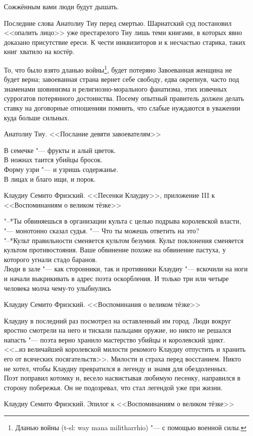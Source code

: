 \epigraph
{Сожжённым вами люди будут дышать.}
{Последние слова Анатолиу Тиу перед смертью.
Шариатский суд постановил <<опалить лицо>> уже престарелого Тиу лишь теми книгами, в которых явно доказано присутствие ереси.
К чести инквизиторов и к несчастью старика, таких книг хватило на костёр.}

\epigraph
{То, что было взято дланью войны\footnote
{Дланью войны (t-sl: way mana militharrhio) "--- с помощью военной силы. \authornote},
будет потеряно\ldotst
Завоеванная женщина не будет верна;
завоеванная страна вернет себе свободу, едва окрепнув, часто под знаменами шовинизма и религиозно-морального фанатизма, этих извечных суррогатов потерянного достоинства.
Посему опытный правитель должен делать ставку на договорные отношения\ldotst и помнить, что слабые нуждаются в уважении куда больше сильных.}
{Анатолиу Тиу.
<<Послание девяти завоевателям>>}

\epigraph
{В семечке "--- фрукты и алый цветок.\\
В ножнах таится убийцы бросок.\\
Форму узри "--- и узришь содержанье.\\
В лицах и благо ищи, и порок.}
{Клаудиу Семито Фризский.
<<Песенки Клаудиу>>, приложение III к <<Воспоминаниям о великом тёзке>>}

\epigraph
{"--*Ты обвиняешься в организации культа с целью подрыва королевской власти, "--- монотонно сказал судья.
"--- Что ты можешь ответить на это?\\
"--*Культ правильности сменяется культом безумия.
Культ поклонения сменяется культом противостояния.
Ваше обвинение похоже на обвинение пастуха, у которого угнали стадо баранов.\\
Люди в зале "--- как сторонники, так и противники Клаудиу "--- вскочили на ноги и начали выкрикивать в адрес поэта оскорбления.
И только три или четыре человека молча чему-то улыбнулись\ldotst}
{Клаудиу Семито Фризский.
<<Воспоминания о великом тёзке>>}

\epigraph
{Клаудиу в последний раз посмотрел на оставленный им город.
Люди вокруг яростно смотрели на него и тискали пальцами оружие, но никто не решался напасть "--- поэта верно хранило мастерство убийцы и королевский эдикт.\\
<<\ldots из величайшей королевской милости рекомого Клаудиу отпустить и хранить его от всяческих посягательств>>.
Милости и страха перед восстанием.
Никто не хотел, чтобы Клаудиу превратился в легенду и знамя для обездоленных.\\
Поэт поправил котомку и, весело насвистывая любимую песенку, направился в сторону побережья.
Он не подозревал, что стал легендой уже при жизни.}
{Клаудиу Семито Фризский. Эпилог к <<Воспоминаниям о великом тёзке>>}

